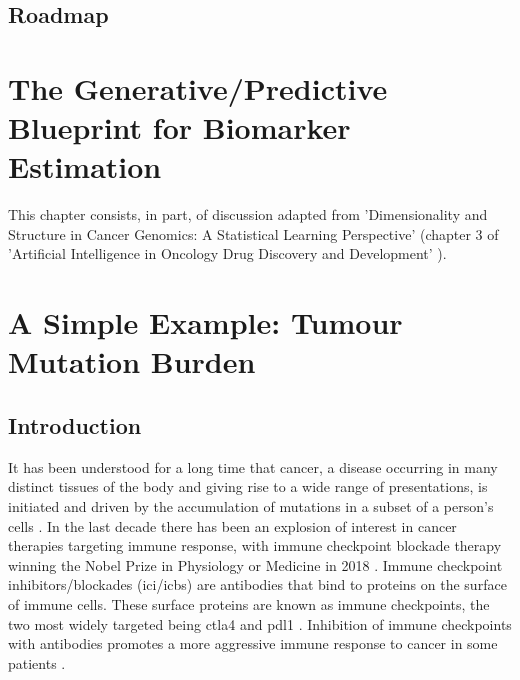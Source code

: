 \documentclass[10pt,twoside,openright]{report}
\begin{document}
\section{Roadmap}

\chapter{The Generative/Predictive Blueprint for Biomarker Estimation}
This chapter consists, in part, of discussion adapted from 'Dimensionality and Structure in Cancer Genomics: A Statistical Learning Perspective' \citep{bradley_dimensionality_2020} (chapter 3 of 'Artificial Intelligence in Oncology Drug Discovery and Development' \citep{cassidy_artificial_2020}).

\chapter{A Simple Example: Tumour Mutation Burden}
\section{Introduction}
It has been understood for a long time that cancer, a disease occurring in many distinct tissues of the body and giving rise to a wide range of presentations, is initiated and driven by the accumulation of mutations in a subset of a person's cells \citep{boveri_concerning_2008}. In the last decade there has been an explosion of interest in cancer therapies targeting immune response, with immune checkpoint blockade therapy winning the Nobel Prize in Physiology or Medicine in 2018 \citep{ledford_cancer_2018}. Immune checkpoint inhibitors/blockades (\acrshort{ici}/\acrshort{icb}s) are antibodies that bind to proteins on the surface of immune cells. These surface proteins are known as immune checkpoints, the two most widely targeted being \acrfull{ctla4} and \acrfull{pdl1} \citep{buchbinder_ctla-4_2016}. Inhibition of immune checkpoints with antibodies promotes a more aggressive immune response to cancer in some patients \citep{pardoll_blockade_2012}.
\end{document}
